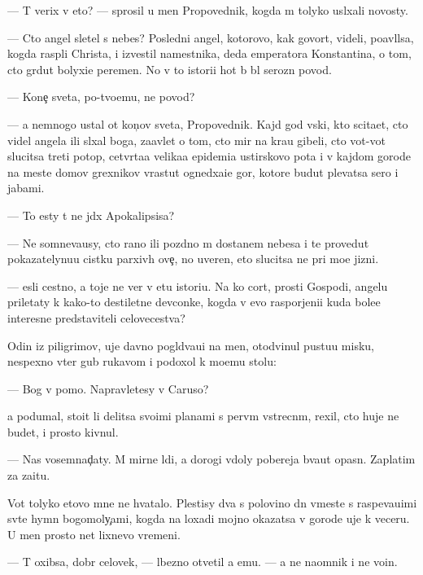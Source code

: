 \documentclass[10pt]{book}
\begin{document}
— T{\yi} verix v eto? — sprosil u men{\ia} Pro\-po\-ved\-nik, kogda m{\yi} tolyko usl{\yi}xali novosty.

— Cto angel sletel s nebes? Posledni{\y} angel, kotorovo, kak govor{\ia}t, videli, po\-{\y}av\-l{\ia}l\-sa, kogda rasp{\ia}li Christa, i izvestil namestnika, deda emperatora Konstantina, o tom, cto gr{\ia}dut bolyxi{\y}e peremen{\yi}. No v to{\y} istori{\y}i hot{\ia} b{\yi} b{\yi}l ser{\y}ozn{\yi}{\y} povod.

— Kone{\c} sveta, po-tvo{\y}emu, ne povod?

— {\Y}a nemnogo ustal ot kon{\c}ov sveta, Pro\-po\-ved\-nik. Kajd{\yi}{\y} god vs{\ia}ki{\y}, kto sci\-ta\-{\y}et, cto videl angela ili sl{\yi}xal boga, za{\y}avl{\ia}{\y}et o tom, cto mir na kra{\y}u gibeli, cto vot-vot slucitsa treti{\y} potop, cetv{\e}rta{\y}a velika{\y}a epidemi{\y}a {\y}ustirskovo pota i v kajdom gorode na meste domov grexnikov v{\yi}rastut ogned{\yi}xa{\x}i{\y}e gor{\yi}, ko\-to\-r{\yi}\-{\y}e budut plevatsa sero{\y} i jabami.

— To {\y}esty t{\yi} ne jd{\e}x Apokalipsisa?

— Ne somneva{\y}usy, cto rano ili pozdno m{\yi} dostanem nebesa i te provedut pokazatelynu{\y}u cistku parxiv{\yi}h ove{\c}, no uveren, eto slucitsa ne pri mo{\y}e{\y} jizni.

— {\Y}esli cestno, {\y}a toje ne ver{\io} v etu istori{\y}u. Na ko{\y} cort, prosti Gospodi, angelu priletaty k kako{\y}-to des{\ia}tiletne{\y} devconke, kogda v {\y}evo raspor{\ia}jeni{\y}i kuda bole{\y}e interesn{\yi}{\y}e predstaviteli celovecestva?

Odin iz piligrimov, uje davno pogl{\ia}d{\yi}va{\y}u{\x}i{\y} na men{\ia}, otodvinul pustu{\y}u mis\-ku, nespexno v{\yi}ter gub{\yi} rukavom i podoxol k mo{\y}emu stolu:

— Bog v pomo{\x}. Napravl{\ia}{\y}etesy v Caruso?

{\Y}a podumal, stoit li delitsa svo{\y}imi planami s perv{\yi}m vstrecn{\yi}m, rexil, cto huje ne budet, i prosto kivnul.

— Nas vosemnad{\c}aty. M{\yi} mirn{\yi}{\y}e l{\io}di, a dorogi vdoly poberej{\y}a b{\yi}va{\y}ut opas\-n{\yi}. Zaplatim za za{\x}itu.

Vot tolyko etovo mne ne hvatalo. Plestisy dva s polovino{\y} dn{\ia} vmeste s raspeva{\y}u{\x}imi sv{\ia}t{\yi}{\y}e hymn{\yi} bogomoly{\c}ami, kogda na loxadi mojno okazatsa v gorode uje k veceru. U men{\ia} prosto net lixnevo vremeni.

— T{\yi} oxibsa, dobr{\yi}{\y} celovek, — l{\io}bezno otvetil {\y}a {\y}emu. — {\Y}a ne na{\y}omnik i ne vo{\y}in.
\end{document}
